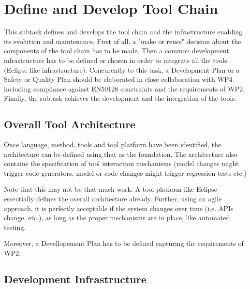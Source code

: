 \documentclass{template/openetcs_article}
\begin{document}
\section{Define and Develop Tool Chain}\label{sec:devtoolchain}


This subtask defines and develops the tool chain and the infrastructure enabling
its evolution and maintenance. First of all, a "make or reuse" decision about
the components of the tool chain has to be made. Then a common development
infrastructure has to be defined or chosen in order to integrate all the tools
(Eclipse like infrastructure). 
Concurently to this task, a  Development Plan or a Safety or Quality Plan should
be elaborated in close collaboration with WP4 including compliance against
EN50128 constraints and the requirements of WP2.
Finally, the subtask achieves the development and the integration of the tools.

\subsection{Overall Tool Architecture}


Once language, method, tools and tool platform have been identified, the architecture can be defined using that as the foundation.  The architecture also contains the specification of tool interaction mechanisms (model changes might trigger code generators, model or code changes might trigger regression tests etc.) 

Note that this may not be that much work:  A tool platform like Eclipse essentially defines the overall architecture already.  Further, using an agile approach, it is perfectly acceptable if the system changes over time (i.e. APIs change, etc.), as long as the proper mechanisms are in place, like automated testing.

Moreover, a Devellopement Plan has to be defined capturing the requirements of WP2.

\subsection{Development Infrastructure}
\end{document}
